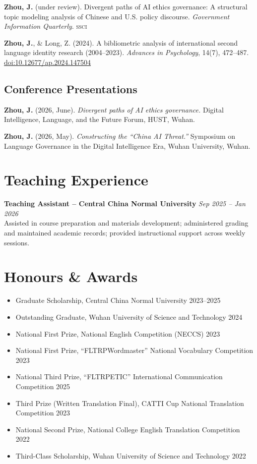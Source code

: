 \documentclass[10pt,a4paper]{article}
\newcommand{\cventry}[4]{
  \textbf{#1} \hfill \textit{\footnotesize #2} \\
  \footnotesize #3 \\
  \footnotesize #4
  \vspace{0.15em}
}
\newcommand{\pubentry}[1]{
  \footnotesize #1
}
\begin{document}
\pubentry{
  \textbf{Zhou, J.} (under review). Divergent paths of AI ethics governance: A structural topic modeling analysis of Chinese and U.S. policy discourse. \textit{Government Information Quarterly}. \hfill \textsc{ssci}
}

\pubentry{
  \textbf{Zhou, J.}, \& Long, Z. (2024). A bibliometric analysis of international second language identity research (2004--2023). \textit{Advances in Psychology}, 14(7), 472--487. \href{https://doi.org/10.12677/ap.2024.147504}{doi:10.12677/ap.2024.147504}
}

\subsection*{\normalsize Conference Presentations}

\pubentry{
  \textbf{Zhou, J.} (2026, June). \textit{Divergent paths of AI ethics governance.} Digital Intelligence, Language, and the Future Forum, HUST, Wuhan.
}

\pubentry{
  \textbf{Zhou, J.} (2026, May). \textit{Constructing the ``China AI Threat.''} Symposium on Language Governance in the Digital Intelligence Era, Wuhan University, Wuhan.
}

\section{Teaching Experience}

\cventry{Teaching Assistant -- Central China Normal University}{Sep 2025 -- Jan 2026}
  {Assisted in course preparation and materials development; administered grading and maintained academic records; provided instructional support across weekly sessions.}
  {}

\section{Honours \& Awards}

\begin{itemize}
  \item Graduate Scholarship, Central China Normal University \hfill 2023--2025
  \item Outstanding Graduate, Wuhan University of Science and Technology \hfill 2024
  \item National First Prize, National English Competition (NECCS) \hfill 2023
  \item National First Prize, ``FLTRP\textperiodcentered Wordmaster'' National Vocabulary Competition \hfill 2023
  \item National Third Prize, ``FLTRP\textperiodcentered ETIC'' International Communication Competition \hfill 2025
  \item Third Prize (Written Translation Final), CATTI Cup National Translation Competition \hfill 2023
  \item National Second Prize, National College English Translation Competition \hfill 2022
  \item Third-Class Scholarship, Wuhan University of Science and Technology \hfill 2022
\end{itemize}
\end{document}
